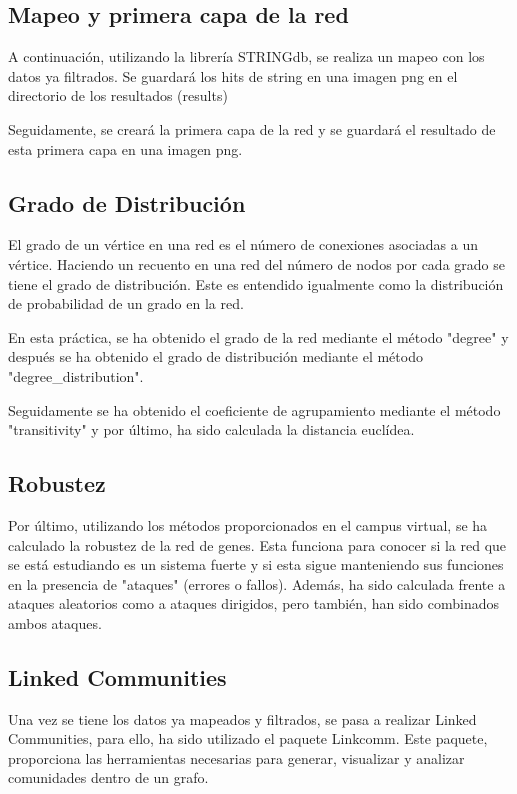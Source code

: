 \subsection{Mapeo y primera capa de la red}
A continuación, utilizando la librería STRINGdb, se realiza un mapeo con los datos ya filtrados. Se guardará los hits de string en una imagen png en el directorio de los resultados (results)

Seguidamente, se creará la primera capa de la red y se guardará el resultado de esta primera capa en una imagen png. 

\subsection{Grado de Distribución}
El grado de un vértice en una red es el número de conexiones asociadas a un vértice. Haciendo un recuento en una red del número de nodos por cada grado se tiene el grado de distribución. Este es entendido igualmente como la distribución de probabilidad de un grado en la red.

En esta práctica, se ha obtenido el grado de la red mediante el  método "degree" y después se ha obtenido el grado de distribución mediante el método "degree_distribution".

Seguidamente se ha obtenido el coeficiente de agrupamiento mediante el método "transitivity" y por último, ha sido calculada la distancia euclídea. 

\subsection{Robustez}
Por último, utilizando los métodos proporcionados en el campus virtual, se ha calculado la robustez de la red de genes. Esta funciona para conocer si la red que se está estudiando es un sistema fuerte y si esta sigue manteniendo sus funciones en la presencia de "ataques" (errores o fallos). Además, ha sido calculada frente a ataques aleatorios como a ataques dirigidos, pero también, han sido combinados ambos ataques.


\subsection{Linked Communities}
Una vez se tiene los datos ya mapeados y filtrados, se pasa a realizar Linked Communities, para ello, ha sido utilizado el paquete Linkcomm. Este paquete, proporciona las herramientas necesarias para generar, visualizar y analizar comunidades dentro de un grafo.

